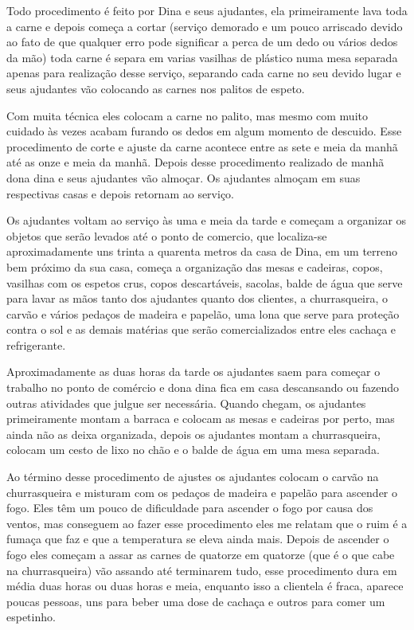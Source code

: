 Todo procedimento é feito por Dina e seus ajudantes, ela primeiramente lava toda 
a carne e depois começa a cortar (serviço demorado e um pouco arriscado devido 
ao fato de que qualquer erro pode significar a perca de um dedo ou vários dedos 
da mão) toda carne é separa em varias vasilhas de plástico numa mesa separada 
apenas para realização desse serviço, separando cada carne no seu devido lugar e 
seus ajudantes vão colocando as carnes nos palitos de espeto. 

Com muita técnica 
eles colocam a carne no palito, mas mesmo com muito cuidado às vezes acabam 
furando os dedos em algum momento de descuido. Esse procedimento de corte e 
ajuste da carne acontece entre as sete e meia da manhã até as onze e meia da 
manhã. Depois desse procedimento realizado de manhã dona dina e seus ajudantes 
vão almoçar. Os ajudantes almoçam em suas respectivas casas e depois retornam ao 
serviço.

Os ajudantes voltam ao serviço às uma e meia da tarde e começam a organizar os 
objetos que serão levados até o ponto de comercio, que localiza-se 
aproximadamente uns trinta a quarenta metros da casa de Dina, em um terreno bem 
próximo da sua casa, começa a organização das mesas e cadeiras, copos, vasilhas 
com os espetos crus, copos descartáveis, sacolas, balde de água que serve para 
lavar as mãos tanto dos ajudantes quanto dos clientes, a churrasqueira, o carvão 
e vários pedaços de madeira e papelão, uma lona que serve para proteção contra o 
sol e as demais matérias que serão comercializados entre eles cachaça e 
refrigerante. 

Aproximadamente as duas horas da tarde os ajudantes saem para começar o trabalho 
no ponto de comércio e dona dina fica em casa descansando ou fazendo outras 
atividades que julgue ser necessária. Quando chegam, os ajudantes primeiramente 
montam a barraca e colocam as mesas e cadeiras por perto, mas ainda não as deixa 
organizada, depois os ajudantes montam a churrasqueira, colocam um cesto de lixo 
no chão e o balde de água em uma mesa separada. 

Ao término desse procedimento de 
ajustes os ajudantes colocam o carvão na churrasqueira e misturam com os pedaços 
de madeira e papelão para ascender o fogo. Eles têm um pouco de dificuldade para 
ascender o fogo por causa dos ventos, mas conseguem ao fazer esse procedimento 
eles me relatam que o ruim é a fumaça que faz e que a temperatura se eleva ainda 
mais. Depois de ascender o fogo eles começam a assar as carnes de quatorze em 
quatorze (que é o que cabe na churrasqueira) vão assando até terminarem tudo, 
esse procedimento dura em média duas horas ou duas horas e meia, enquanto isso a 
clientela é fraca, aparece poucas pessoas, uns para beber uma dose de cachaça e 
outros para comer um espetinho. 

